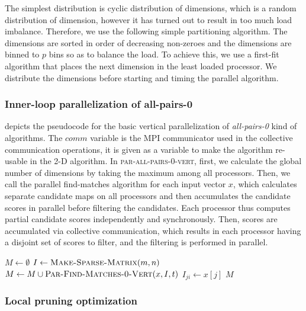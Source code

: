 \documentclass{comjnl}
\newcommand{\algo}[1]{\textsc{#1}} %
\newcommand{\var}[1]{\mbox{\textsl{#1}}} %
\begin{document}
The simplest distribution is cyclic distribution of dimensions, which
is a random distribution of dimension, however it has turned out to
result in too much load imbalance. Therefore, we use the following
simple partitioning algorithm. The dimensions are sorted in order of
decreasing non-zeroes and the dimensions are binned to $p$ bins so as
to balance the load. To achieve this, we use a first-fit algorithm
that places the next dimension in the least loaded processor.  We
distribute the dimensions before starting and timing the parallel
algorithm.

\subsubsection{Inner-loop parallelization of all-pairs-0}

 depicts the pseudocode for the
basic vertical parallelization of \var{all-pairs-0} kind of algorithms. The
$comm$ variable is the MPI communicator used in the collective
communication operations, it is given as a variable to make the
algorithm re-usable in the 2-D algorithm.  In
\algo{par-all-pairs-0-vert}, first, we calculate the global number of
dimensions by taking the maximum among all processors. Then, we call
the parallel find-matches algorithm for each input vector $x$, which
calculates separate candidate maps on all processors and then
accumulates the candidate scores in parallel before filtering the
candidates.  Each processor thus computes partial candidate scores
independently and synchronously.  Then, scores are accumulated via
collective communication, which results in each processor having a
disjoint set of scores to filter, and the filtering is performed in
parallel.

\begin{algorithm}[top]
  \caption{$\algo{Par-All-Pairs-0-Vert}(V,t, comm)$}
  \label{alg:par-all-pairs-0-vert}
  \begin{algorithmic}
    \STATE $M \gets \emptyset$ \STATE $I \gets
    \algo{Make-Sparse-Matrix}(m, n)$  \STATE $M
    \gets M \cup \algo{Par-Find-Matches-0-Vert}(x, I, t)$
     \STATE $I_{ji} \gets x[j]$
    \ENDFOR
    \ENDFOR
    \RETURN $M$
  \end{algorithmic}
\end{algorithm}

  
\subsubsection{Local pruning optimization}
\label{sec:localpruning}
\end{document}
